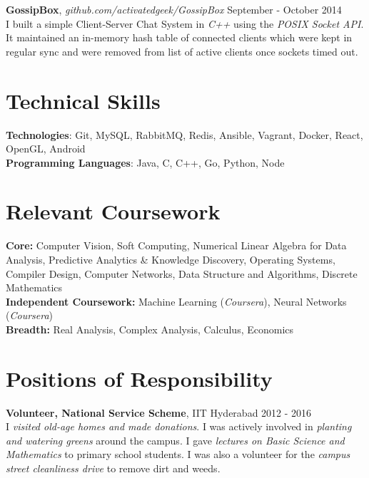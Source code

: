 \documentclass[margin,line]{res}
\begin{document}
\begin{resume}
  \vspace*{-2.5mm}

  {\bf GossipBox}, {\it github.com/activatedgeek/GossipBox} \hfill September - October 2014 \\
    I built a simple Client-Server Chat System in {\it C++} using the {\it POSIX Socket API}. It maintained an in-memory hash table of connected clients which were kept in regular sync and were removed from list of active clients once sockets timed out.

\section{\sc Technical Skills}

  {\bf Technologies}: Git, MySQL, RabbitMQ, Redis, Ansible, Vagrant, Docker, React, OpenGL, Android \\
  {\bf Programming Languages}: Java, C, C++, Go, Python, Node

\section{\sc Relevant Coursework}

  {\bf Core:} Computer Vision, Soft Computing, Numerical Linear Algebra for Data Analysis, Predictive Analytics \& Knowledge Discovery, Operating Systems, Compiler Design, Computer Networks, Data Structure and Algorithms, Discrete Mathematics \\
  {\bf Independent Coursework:} Machine Learning ({\it Coursera}), Neural Networks ({\it Coursera}) \\
  {\bf Breadth:} Real Analysis, Complex Analysis, Calculus, Economics

\section{\sc Positions of Responsibility}

  {\bf Volunteer, National Service Scheme}, IIT Hyderabad \hfill 2012 - 2016 \\
    I {\it visited old-age homes and made donations}. I was actively involved in {\it planting and watering greens} around the campus. I gave {\it lectures on Basic Science and Mathematics} to primary school students. I was also a volunteer for the {\it campus street cleanliness drive} to remove dirt and weeds.

  \vspace*{-2.5mm}


\end{resume}
\end{document}

